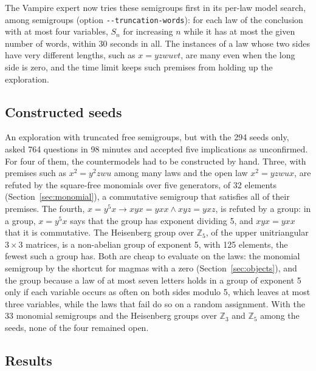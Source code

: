 \documentclass[11pt,a4paper]{article}
\theoremstyle{definition}
\theoremstyle{remark}
\newcommand{\code}[1]{\texttt{#1}}
\begin{document}
The Vampire expert now tries these semigroups first in its per-law model search, among semigroups (option \code{-{}-truncation-words}): for each law of the conclusion with at most four variables, $S_n$ for increasing $n$ while it has at most the given number of words, within 30 seconds in all. The instances of a law whose two sides have very different lengths, such as $x = yzwuvt$, are many even when the long side is zero, and the time limit keeps such premises from holding up the exploration.

\subsection{Constructed seeds}\label{sec:constructed}

An exploration with truncated free semigroups, but with the 294 seeds only, asked 764 questions in 98 minutes and accepted five implications as unconfirmed. For four of them, the countermodels had to be constructed by hand. Three, with premises such as $x^2 = y^2zwu$ among many laws and the open law $x^2 = yzwux$, are refuted by the square-free monomials over five generators, of 32 elements (Section~\ref{sec:monomial}), a commutative semigroup that satisfies all of their premises. The fourth, $x = y^5x \to xyx = yxx \wedge xyz = yxz$, is refuted by a group: in a group, $x = y^5x$ says that the group has exponent dividing 5, and $xyx = yxx$ that it is commutative. The Heisenberg group over $\mathbb{Z}_5$, of the upper unitriangular $3 \times 3$ matrices, is a non-abelian group of exponent 5, with 125 elements, the fewest such a group has. Both are cheap to evaluate on the laws: the monomial semigroup by the shortcut for magmas with a zero (Section~\ref{sec:objects}), and the group because a law of at most seven letters holds in a group of exponent 5 only if each variable occurs as often on both sides modulo 5, which leaves at most three variables, while the laws that fail do so on a random assignment. With the 33 monomial semigroups and the Heisenberg groups over $\mathbb{Z}_3$ and $\mathbb{Z}_5$ among the seeds, none of the four remained open.

\subsection{Results}
\end{document}

